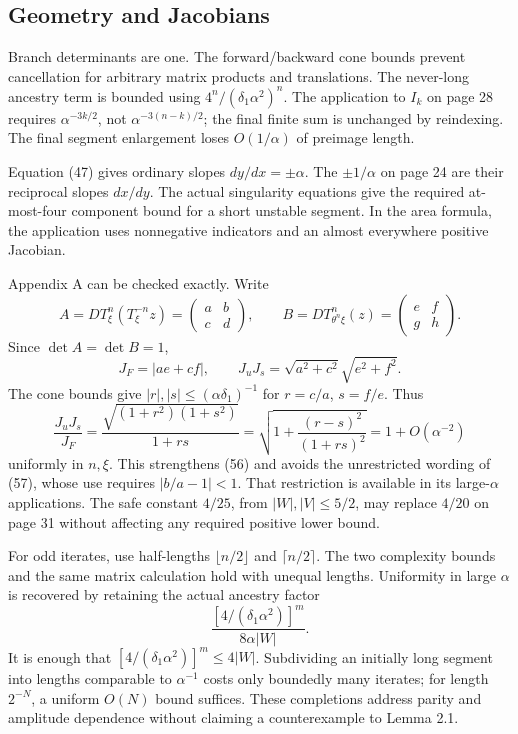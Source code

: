 \documentclass[10pt]{article}
\begin{document}
\subsection*{Geometry and Jacobians}
Branch determinants are one. The forward/backward cone bounds prevent cancellation for arbitrary matrix products and translations. The never-long ancestry term is bounded using \(4^n/(\delta_1\alpha^2)^n\). The application to \(I_k\) on page 28 requires \(\alpha^{-3k/2}\), not \(\alpha^{-3(n-k)/2}\); the final finite sum is unchanged by reindexing. The final segment enlargement loses \(O(1/\alpha)\) of preimage length.\par
Equation (47) gives ordinary slopes \(dy/dx=\pm\alpha\). The \(\pm1/\alpha\) on page 24 are their reciprocal slopes \(dx/dy\). The actual singularity equations give the required at-most-four component bound for a short unstable segment. In the area formula, the application uses nonnegative indicators and an almost everywhere positive Jacobian.\par
Appendix A can be checked exactly. Write \[A=D T_\xi^n(T_\xi^{-n}z)=\begin{pmatrix}a&b\\c&d\end{pmatrix},
 \qquad B=D T_{\theta^n\xi}^n(z)=\begin{pmatrix}e&f\\g&h\end{pmatrix}.\] Since \(\det A=\det B=1\), \[J_F=|ae+cf|,\qquad J_uJ_s=\sqrt{a^2+c^2}\sqrt{e^2+f^2}.\] The cone bounds give \(|r|,|s|\le(\alpha\delta_1)^{-1}\) for \(r=c/a\), \(s=f/e\). Thus \[\frac{J_uJ_s}{J_F}
 =\frac{\sqrt{(1+r^2)(1+s^2)}}{1+rs}
 =\sqrt{1+\frac{(r-s)^2}{(1+rs)^2}}
 =1+O(\alpha^{-2})\] uniformly in \(n,\xi\). This strengthens (56) and avoids the unrestricted wording of (57), whose use requires \(|b/a-1|<1\). That restriction is available in its large-\(\alpha\) applications. The safe constant \(4/25\), from \(|W|,|V|\le5/2\), may replace \(4/20\) on page 31 without affecting any required positive lower bound.\par
For odd iterates, use half-lengths \(\lfloor n/2\rfloor\) and \(\lceil n/2\rceil\). The two complexity bounds and the same matrix calculation hold with unequal lengths. Uniformity in large \(\alpha\) is recovered by retaining the actual ancestry factor \[\frac{[4/(\delta_1\alpha^2)]^m}{8\alpha|W|}.\] It is enough that \([4/(\delta_1\alpha^2)]^m\le4|W|\). Subdividing an initially long segment into lengths comparable to \(\alpha^{-1}\) costs only boundedly many iterates; for length \(2^{-N}\), a uniform \(O(N)\) bound suffices. These completions address parity and amplitude dependence without claiming a counterexample to Lemma 2.1.\par
\end{document}
